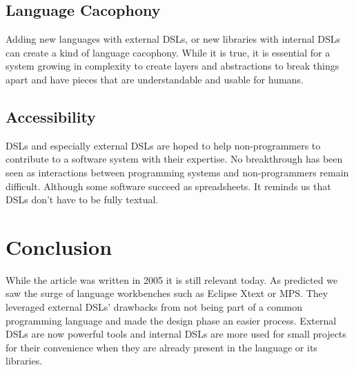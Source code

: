 \documentclass{proc}
\begin{document}
\subsection{Language Cacophony}
Adding new languages with external DSLs, or new libraries with internal DSLs can
create a kind of language cacophony. While it is true, it is essential for a
system growing in complexity to create layers and abstractions to break things
apart and have pieces that are understandable and usable for humans.

\subsection{Accessibility}
DSLs and especially external DSLs are hoped to help non-programmers to
contribute to a software system with their expertise. No breakthrough has been
seen as interactions between programming systems and non-programmers remain
difficult. Although some software succeed as spreadsheets. It reminds us that
DSLs don't have to be fully textual.


\section{Conclusion}
\label{conclusion}
While the article was written in 2005 it is still relevant today. As predicted
we saw the surge of language workbenches such as Eclipse Xtext or MPS\@. They
leveraged external DSLs' drawbacks from not being part of a common programming
language and made the design phase an easier process. External DSLs are now
powerful tools and internal DSLs are more used for small projects for their
convenience when they are already present in the language or its libraries.
\end{document}
